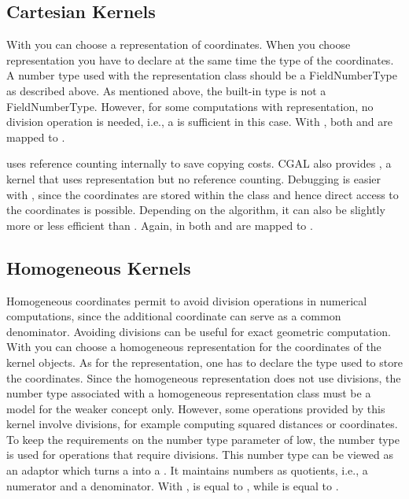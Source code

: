 \subsection{Cartesian Kernels}
With  you can choose a
 representation of coordinates. When you
choose  representation you have to
declare at the same time the type of the coordinates.  A number type
used with the  representation class should be a
FieldNumberType as described above. As mentioned above, the built-in
type  is not a FieldNumberType. However, for some
computations with  representation, no
division operation is needed, i.e., a  is sufficient in
this case. With , both
 and
 are mapped to
.

 uses reference counting internally to
save copying costs. CGAL also provides
, a kernel that uses
 representation but no reference
counting.  Debugging is easier with
, since the coordinates are
stored within the class and hence direct access to the coordinates is
possible.  Depending on the algorithm, it can also be slightly more or
less efficient than . Again, in
 both
 and
 are mapped to
.

\subsection{Homogeneous Kernels}
Homogeneous coordinates permit to avoid division operations in
numerical computations, since the additional coordinate can serve as a
common denominator.  Avoiding divisions can be useful for exact
geometric computation.  With  you can
choose a homogeneous representation for the coordinates of the kernel
objects. As for the  representation, one
has to declare the type used to store the coordinates. Since the
homogeneous representation does not use divisions, the number type
associated with a homogeneous representation class must be a model for
the weaker concept  only. However, some operations
provided by this kernel involve divisions, for example computing
squared distances or  coordinates. To
keep the requirements on the number type parameter of
 low, the number type
 is used for operations that require
divisions. This number type can be viewed as an adaptor which turns a
 into a . It maintains numbers as
quotients, i.e., a numerator and a denominator. With
,
 is equal to
, while
 is equal to
.


